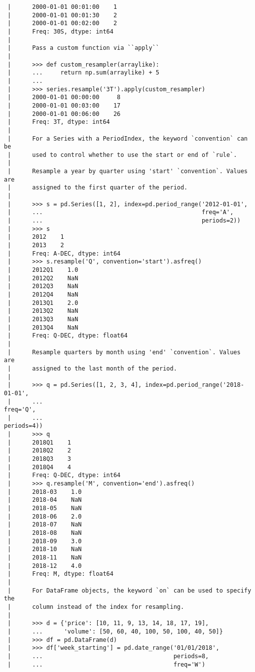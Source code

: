 \documentclass[
  letterpaper,
  DIV=11,
  numbers=noendperiod]{scrreprt}
\begin{document}
\begin{verbatim}
 |      2000-01-01 00:01:00    1
 |      2000-01-01 00:01:30    2
 |      2000-01-01 00:02:00    2
 |      Freq: 30S, dtype: int64
 |      
 |      Pass a custom function via ``apply``
 |      
 |      >>> def custom_resampler(arraylike):
 |      ...     return np.sum(arraylike) + 5
 |      ...
 |      >>> series.resample('3T').apply(custom_resampler)
 |      2000-01-01 00:00:00     8
 |      2000-01-01 00:03:00    17
 |      2000-01-01 00:06:00    26
 |      Freq: 3T, dtype: int64
 |      
 |      For a Series with a PeriodIndex, the keyword `convention` can be
 |      used to control whether to use the start or end of `rule`.
 |      
 |      Resample a year by quarter using 'start' `convention`. Values are
 |      assigned to the first quarter of the period.
 |      
 |      >>> s = pd.Series([1, 2], index=pd.period_range('2012-01-01',
 |      ...                                             freq='A',
 |      ...                                             periods=2))
 |      >>> s
 |      2012    1
 |      2013    2
 |      Freq: A-DEC, dtype: int64
 |      >>> s.resample('Q', convention='start').asfreq()
 |      2012Q1    1.0
 |      2012Q2    NaN
 |      2012Q3    NaN
 |      2012Q4    NaN
 |      2013Q1    2.0
 |      2013Q2    NaN
 |      2013Q3    NaN
 |      2013Q4    NaN
 |      Freq: Q-DEC, dtype: float64
 |      
 |      Resample quarters by month using 'end' `convention`. Values are
 |      assigned to the last month of the period.
 |      
 |      >>> q = pd.Series([1, 2, 3, 4], index=pd.period_range('2018-01-01',
 |      ...                                                   freq='Q',
 |      ...                                                   periods=4))
 |      >>> q
 |      2018Q1    1
 |      2018Q2    2
 |      2018Q3    3
 |      2018Q4    4
 |      Freq: Q-DEC, dtype: int64
 |      >>> q.resample('M', convention='end').asfreq()
 |      2018-03    1.0
 |      2018-04    NaN
 |      2018-05    NaN
 |      2018-06    2.0
 |      2018-07    NaN
 |      2018-08    NaN
 |      2018-09    3.0
 |      2018-10    NaN
 |      2018-11    NaN
 |      2018-12    4.0
 |      Freq: M, dtype: float64
 |      
 |      For DataFrame objects, the keyword `on` can be used to specify the
 |      column instead of the index for resampling.
 |      
 |      >>> d = {'price': [10, 11, 9, 13, 14, 18, 17, 19],
 |      ...      'volume': [50, 60, 40, 100, 50, 100, 40, 50]}
 |      >>> df = pd.DataFrame(d)
 |      >>> df['week_starting'] = pd.date_range('01/01/2018',
 |      ...                                     periods=8,
 |      ...                                     freq='W')

\end{verbatim}
\end{document}
